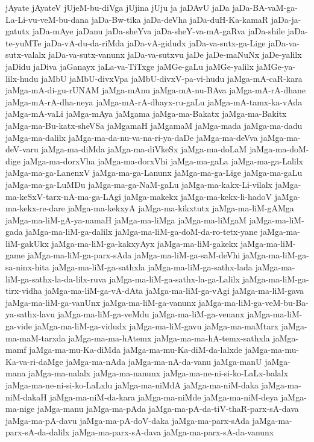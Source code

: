 {jAyate
jAyateV
jUjeM-bu-diVga
jUjina
jUju
ja
jaDAvU
jaDa
jaDa-BA-vaM-ga-La-Li-vu-veM-bu-dana
jaDa-Bw-tika
jaDa-deVha
jaDa-duH-Ka-kamaR
jaDa-ja-gatutx
jaDa-mAye
jaDanu
jaDa-sheYva
jaDa-sheY-va-mA-gaRva
jaDa-shile
jaDa-te-yuMTe
jaDa-vA-du-da-riMda
jaDa-vA-gidudx
jaDa-va-sutx-ga-Lige
jaDa-va-sutx-valalx
jaDa-va-sutx-vanunx
jaDa-va-sutxvu
jaDe
jaDe-maNuNx
jaDe-yalilx
jaDidu
jaDiva
jaGanayx
jaLa-va-TiTxge
jaMGe-gaLu
jaMGe-yalilx
jaMGe-ya-lilx-hudu
jaMbU
jaMbU-divxVpa
jaMbU-divxV-pa-vi-hudu
jaMga-mA-caR-kara
jaMga-mA-di-gu-rUNAM
jaMga-mAnu
jaMga-mA-nu-BAva
jaMga-mA-rA-dhane
jaMga-mA-rA-dha-neya
jaMga-mA-rA-dhayx-ru-gaLu
jaMga-mA-tamx-ka-vAda
jaMga-mA-vaLi
jaMga-mAya
jaMgama
jaMga-ma-Bakatx
jaMga-ma-Bakitx
jaMga-ma-Bu-katx-sheVSa
jaMgamaH
jaMgamaM
jaMga-mada
jaMga-ma-dadu
jaMga-ma-dalilx
jaMga-ma-da-nu-va-na-ri-ya-daDe
jaMga-ma-deVva
jaMga-ma-deV-varu
jaMga-ma-diMda
jaMga-ma-diVkeSx
jaMga-ma-doLaM
jaMga-ma-doM-dige
jaMga-ma-dorxVha
jaMga-ma-dorxVhi
jaMga-ma-gaLa
jaMga-ma-ga-Lalilx
jaMga-ma-ga-LanenxV
jaMga-ma-ga-Lanunx
jaMga-ma-ga-Lige
jaMga-ma-gaLu
jaMga-ma-ga-LuMDu
jaMga-ma-ga-NaM-gaLu
jaMga-ma-kakx-Li-vilalx
jaMga-ma-keSxV-tarx-nA-ma-ga-LAgi
jaMga-makekx
jaMga-ma-kekx-li-hadoV
jaMga-ma-kekx-re-dare
jaMga-ma-kekxyA
jaMga-ma-kikxtutx
jaMga-ma-liM-gAMga
jaMga-ma-liM-gA-ya-namaH
jaMga-ma-liMga
jaMga-ma-liMgaM
jaMga-ma-liM-gada
jaMga-ma-liM-ga-dalilx
jaMga-ma-liM-ga-doM-da-ro-tetx-yane
jaMga-ma-liM-gakUkx
jaMga-ma-liM-ga-kakxyAyx
jaMga-ma-liM-gakekx
jaMga-ma-liM-game
jaMga-ma-liM-ga-parx-sAda
jaMga-ma-liM-ga-saM-deVhi
jaMga-ma-liM-ga-sa-ninx-hita
jaMga-ma-liM-ga-sathxla
jaMga-ma-liM-ga-sathx-lada
jaMga-ma-liM-ga-sathx-la-da-lilx-ruva
jaMga-ma-liM-ga-sathx-la-ga-Lalilx
jaMga-ma-liM-ga-tirx-vidha
jaMga-ma-liM-ga-vA-dAta
jaMga-ma-liM-ga-vAgi
jaMga-ma-liM-gava
jaMga-ma-liM-ga-vanUnx
jaMga-ma-liM-ga-vanunx
jaMga-ma-liM-ga-veM-bu-Ba-ya-sathx-lavu
jaMga-ma-liM-ga-veMdu
jaMga-ma-liM-ga-venanx
jaMga-ma-liM-ga-vide
jaMga-ma-liM-ga-vidudx
jaMga-ma-liM-gavu
jaMga-ma-maMtarx
jaMga-ma-maM-tarxda
jaMga-ma-ma-hAtemx
jaMga-ma-ma-hA-temx-sathxla
jaMga-mamf
jaMga-ma-mu-Ka-diMda
jaMga-ma-mu-Ka-diM-da-lalxde
jaMga-ma-mu-Ka-va-ri-daMge
jaMga-ma-nAda
jaMga-ma-nA-da-vanu
jaMga-manU
jaMga-mana
jaMga-ma-nalalx
jaMga-ma-nanunx
jaMga-ma-ne-ni-si-ko-LaLx-balalx
jaMga-ma-ne-ni-si-ko-LaLxlu
jaMga-ma-niMdA
jaMga-ma-niM-daka
jaMga-ma-niM-dakaH
jaMga-ma-niM-da-kara
jaMga-ma-niMde
jaMga-ma-niM-deya
jaMga-ma-nige
jaMga-manu
jaMga-ma-pAda
jaMga-ma-pA-da-tiV-thaR-parx-sA-dava
jaMga-ma-pA-davu
jaMga-ma-pA-doV-daka
jaMga-ma-parx-sAda
jaMga-ma-parx-sA-da-dalilx
jaMga-ma-parx-sA-dava
jaMga-ma-parx-sA-da-vanunx
}
